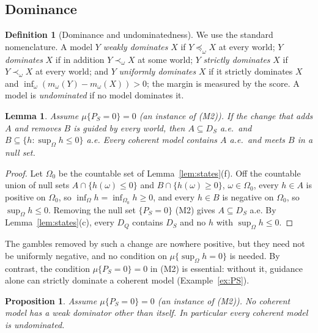 \documentclass[11pt]{article}
\theoremstyle{plain}
\newtheorem{proposition}[theorem]{Proposition}
\newtheorem{lemma}[theorem]{Lemma}
\theoremstyle{definition}
\newtheorem{definition}[theorem]{Definition}
\theoremstyle{remark}
\begin{document}
\subsection{Dominance}\label{sec:dominance}

\begin{definition}[Dominance and undominatedness]\label{def:dominance}
We use the standard nomenclature. A model $Y$ \emph{weakly dominates} $X$ if $Y\preceq_\omega X$
at every world; $Y$ \emph{dominates} $X$ if in addition $Y\prec_\omega X$ at some world; $Y$
\emph{strictly dominates} $X$ if $Y\prec_\omega X$ at every world; and $Y$ \emph{uniformly
dominates} $X$ if it strictly dominates $X$ and $\inf_\omega(m_\omega(Y)-m_\omega(X))>0$; the margin is measured by the
score. A model is \emph{undominated} if no model dominates it.
\end{definition}

\begin{lemma}\label{lem:guidedeverywhere}
Assume $\mu\{P_S=0\}=0$ (an instance of (M2)). If the change that adds $A$ and removes $B$ is
guided by every world, then
$A\subseteq D_S$ a.e.\ and $B\subseteq\{h:\sup_\Omega h\le0\}$ a.e. Every coherent model
contains $A$ a.e.\ and meets $B$ in a null set.
\end{lemma}

\begin{proof}
Let $\Omega_0$ be the countable set of Lemma~\ref{lem:states}(f). Off the countable union of
null sets $A\cap\{h(\omega)\le0\}$ and $B\cap\{h(\omega)\ge0\}$, $\omega\in\Omega_0$, every
$h\in A$ is positive on $\Omega_0$, so $\inf_\Omega h=\inf_{\Omega_0}h\ge0$, and every $h\in B$
is negative on $\Omega_0$, so $\sup_\Omega h\le0$. Removing the null set $\{P_S=0\}$ (M2) gives
$A\subseteq D_S$ a.e. By Lemma~\ref{lem:states}(c), every $D_Q$ contains $D_S$ and no $h$ with
$\sup_\Omega h\le0$.
\end{proof}

The gambles removed by such a change are nowhere positive, but they need not be uniformly
negative, and no condition on $\mu\{\sup_\Omega h=0\}$ is needed. By contrast, the condition
$\mu\{P_S=0\}=0$ in (M2) is essential: without it, guidance alone can strictly dominate a
coherent model (Example~\ref{ex:PS}).

\begin{proposition}\label{prop:protect}
Assume $\mu\{P_S=0\}=0$ (an instance of (M2)). No coherent model has a weak dominator other
than itself. In particular every
coherent model is undominated.
\end{proposition}
\end{document}
